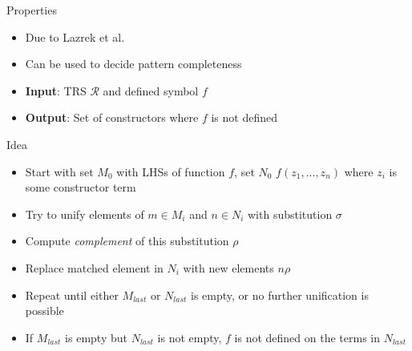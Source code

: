 \begin{frame}{Properties}
\begin{itemize}
    \item Due to Lazrek et al.
    \item Can be used to decide pattern completeness
    \item \textbf{Input}: TRS $\mathcal{R}$ and defined symbol $f$
    \item \textbf{Output}: Set of constructors where $f$ is not defined    
\end{itemize}

\end{frame}

\begin{frame}{Idea}
    \begin{itemize}
        \item Start with set $M_0$ with LHSs of function $f$, set $N_0$ $f(z_1, ..., z_n)$ where $z_i$ is some constructor term 
        \item Try to unify elements of $m \in M_i$ and $n \in N_i$ with substitution $\sigma$
        \item Compute \textit{complement} of this substitution $\rho$
        \item Replace matched element in $N_i$ with new elements $n\rho$
        \item Repeat until either $M_{last}$ or $N_{last}$ is empty, or no further unification is possible
        \item If $M_{last}$ is empty but $N_{last}$ is not empty, $f$ is not defined on the terms in $N_{last}$
    \end{itemize}
\end{frame}



